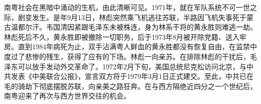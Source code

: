 南粤社会在黑暗中涌动的生机，由此清晰可见。1971年，就在军队系统不可一世之际，剧变发生。是年9月13日，林彪突然乘飞机逃往苏联，半路因飞机失事死于蒙古温都尔汗。韦国清因紧跟毛泽东未被株连，身为林系干将的黄永胜则难逃一劫。林彪死后不久，黄永胜即被撤除一切职务，后于1973年8月被开除党籍、送入牢房。直到1984年病死为止，双手沾满粤人鲜血的黄永胜都没有恢复自由，在监禁中度过了悲惨的残生，获得了应有的下场。林彪一向亲苏。在排除林彪的干扰后，毛泽东可以放手发动外交革命了。1972年2月下旬，美国总统尼克松访问北京，与中共发表《中美联合公报》，宣言双方将于1979年3月1日正式建交。至此，中共已在毛的骑劫下彻底摆脱苏联，向亲美之路狂奔。在与西方隔绝近四分之一个世纪后，南粤迎来了再次与西方世界交往的机会。













